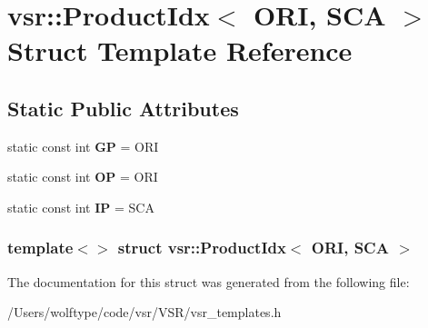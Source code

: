 \hypertarget{structvsr_1_1_product_idx_3_01_o_r_i_00_01_s_c_a_01_4}{\section{vsr\-:\-:Product\-Idx$<$ O\-R\-I, S\-C\-A $>$ Struct Template Reference}
\label{structvsr_1_1_product_idx_3_01_o_r_i_00_01_s_c_a_01_4}
}
\subsection*{Static Public Attributes}
\begin{DoxyCompactItemize}
\item 
\hypertarget{structvsr_1_1_product_idx_3_01_o_r_i_00_01_s_c_a_01_4_a5436652d5d279d8c32e542601320c745}{static const int {\bfseries G\-P} = O\-R\-I}\label{structvsr_1_1_product_idx_3_01_o_r_i_00_01_s_c_a_01_4_a5436652d5d279d8c32e542601320c745}

\item 
\hypertarget{structvsr_1_1_product_idx_3_01_o_r_i_00_01_s_c_a_01_4_aef82b0bc8f277817d903a67246458dcd}{static const int {\bfseries O\-P} = O\-R\-I}\label{structvsr_1_1_product_idx_3_01_o_r_i_00_01_s_c_a_01_4_aef82b0bc8f277817d903a67246458dcd}

\item 
\hypertarget{structvsr_1_1_product_idx_3_01_o_r_i_00_01_s_c_a_01_4_a953220d8966832e23a5d9a340ef19a45}{static const int {\bfseries I\-P} = S\-C\-A}\label{structvsr_1_1_product_idx_3_01_o_r_i_00_01_s_c_a_01_4_a953220d8966832e23a5d9a340ef19a45}

\end{DoxyCompactItemize}
\subsubsection*{template$<$$>$ struct vsr\-::\-Product\-Idx$<$ O\-R\-I, S\-C\-A $>$}



The documentation for this struct was generated from the following file\-:\begin{DoxyCompactItemize}
\item 
/\-Users/wolftype/code/vsr/\-V\-S\-R/vsr\-\_\-templates.\-h\end{DoxyCompactItemize}
